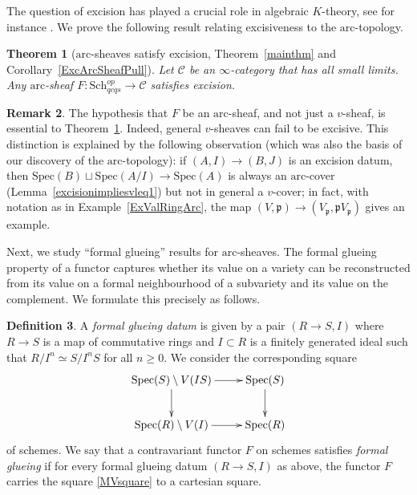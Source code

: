 \documentclass[reqno]{amsart}
\newcommand{\spec}{\mathrm{Spec}}
\newcommand{\arc}{\mathrm{arc}}
\newtheorem{theorem}{Theorem}[section]
\theoremstyle{definition}
\newtheorem{definition}[theorem]{Definition}
\newtheorem{remark}[theorem]{Remark}
\begin{document}
The question of excision has played a crucial role in algebraic $K$-theory, see
for instance \cite{SW, Cortinas, GHexc, LT19}. We prove the following result relating excisiveness to the $\arc$-topology.


\begin{theorem}[$\arc$-sheaves satisfy excision, Theorem~\ref{mainthm} and
Corollary~\ref{ExcArcSheafPull}] 
\label{ArcExcIntro}
Let $\mathcal{C}$ be an $\infty$-category that has all small limits. 
Any $\arc$-sheaf $F\colon \mathrm{Sch}_{qcqs}^{op} \to \mathcal{C}$  satisfies excision. 
\end{theorem} 

\begin{remark}
\label{ArcNeccExc}
The hypothesis that $F$ be an $\arc$-sheaf, and not just a $v$-sheaf, is essential to Theorem~\ref{ArcExcIntro}. Indeed, general $v$-sheaves can fail to be excisive. This distinction is explained by the following observation (which was also the basis of our discovery of the $\arc$-topology):  if $(A,I) \to (B,J)$ is an excision datum, then $\spec(B) \sqcup \spec(A/I) \to \spec(A)$ is always an $\arc$-cover (Lemma~\ref{excisionimpliesvleq1}) but not in general a $v$-cover; in fact, with notation as in Example~\ref{ExValRingArc}, the map $(V,\mathfrak{p}) \to (V_{\mathfrak{p}}, \mathfrak{p} V_{\mathfrak{p}})$ gives an example.
\end{remark}



Next, we study ``formal glueing'' results for $\arc$-sheaves. The formal glueing property of a functor captures whether its value on a variety can be reconstructed from its value on a formal neighbourhood of a subvariety and its value on the complement. We formulate this precisely as follows.

\begin{definition}
\label{DefFormalGlueing}
A {\em formal glueing datum} is given by a pair $(R \to S, I)$ where $R \to S$
is a map of commutative rings and $I \subset R$ is a finitely generated ideal
such that $R/I^n \simeq S/I^n S$ for all $n \geq 0$. We consider the corresponding square
\begin{equation}
\label{MVsquare}
\xymatrix{ \spec(S) \setminus V(IS) \ar[r] \ar[d] & \spec(S) \ar[d] \\
		\spec(R) \setminus V(I) \ar[r] & \spec(R) }
		\end{equation}
of schemes. We say that a contravariant functor $F$ on schemes satisfies {\em formal glueing} if for every formal glueing datum $(R \to S, I)$ as above, the functor $F$ carries the square \eqref{MVsquare} to a cartesian square. 
\end{definition}
\end{document}
